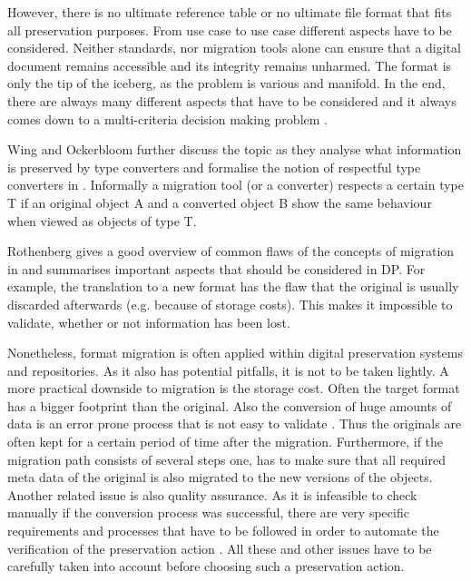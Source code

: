 However, there is no ultimate reference table or no ultimate file format that fits all preservation purposes. From use case to use case different aspects have to be considered. Neither standards, nor migration tools alone can ensure that a digital document remains accessible and its integrity remains unharmed. The format is only the tip of the iceberg, as the problem is various and manifold. In the end, there are always many different aspects that have to be considered and it always comes down to a multi-criteria decision making problem \cite{becker:decision}.

Wing and Ockerbloom further discuss the topic as they analyse what information is preserved by type converters and formalise the notion of respectful type converters in \cite{859529}. Informally a migration tool (or a converter) respects a certain type T if an original object A and a converted object B show the same behaviour when viewed as objects of type T.

Rothenberg gives a good overview of common flaws of the concepts of migration in \cite{rothenberg:1999:ensuring} and summarises important aspects that should be considered in DP. For example, the translation to a new format has the flaw that the original is usually discarded afterwards (e.g. because of storage costs). This makes it impossible to validate, whether or not information has been lost.

Nonetheless, format migration is often applied within digital preservation systems and repositories. As it also has potential pitfalls, it is not to be taken lightly.
A more practical downside to migration is the storage cost. Often the target format has a bigger footprint than the original. Also the conversion of huge amounts of data is an error prone process that is not easy to validate \cite{Lorie:2001:LTP:379437.379726}. Thus the originals are often kept for a certain period of time after the migration. Furthermore, if the migration path consists of several steps one, has to make sure that all required meta data of the original is also migrated to the new versions of the objects. Another related issue is also quality assurance. As it is infeasible to check manually if the conversion process was successful, there are very specific requirements and processes that have to be followed in order to automate the verification of the preservation action \cite{feng:2010:qrofm, becker:decision}.
All these and other issues have to be carefully taken into account before choosing such a preservation action.
\newline

